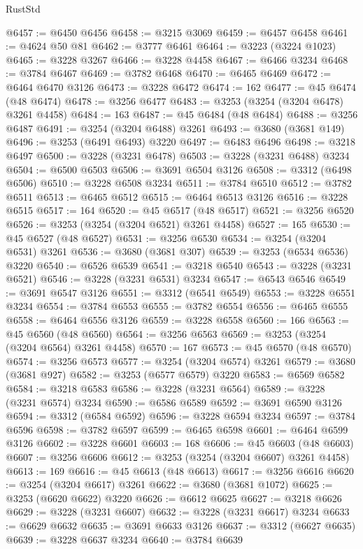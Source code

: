 \begin{lexlean}{RustStd}
\begin{coremodule}
@6457 := @6450 @6456
@6458 := @3215 @3069
@6459 := @6457 @6458
@6461 := @4624 @50 @81
@6462 := @3777 @6461
@6464 := @3223 (@3224 @1023)
@6465 := @3228 @3267
@6466 := @3228 @4458
@6467 := @6466 @3234
@6468 := @3784 @6467
@6469 := @3782 @6468
@6470 := @6465 @6469
@6472 := @6464 @6470 @3126
@6473 := @3228 @6472
@6474 := 162
@6477 := @45 @6474 (@48 @6474)
@6478 := @3256 @6477
@6483 := @3253 (@3254 (@3204 @6478) @3261 @4458)
@6484 := 163
@6487 := @45 @6484 (@48 @6484)
@6488 := @3256 @6487
@6491 := @3254 (@3204 @6488) @3261
@6493 := @3680 (@3681 @149)
@6496 := @3253 (@6491 @6493) @3220
@6497 := @6483 @6496
@6498 := @3218 @6497
@6500 := @3228 (@3231 @6478)
@6503 := @3228 (@3231 @6488) @3234
@6504 := @6500 @6503
@6506 := @3691 @6504 @3126
@6508 := @3312 (@6498 @6506)
@6510 := @3228 @6508 @3234
@6511 := @3784 @6510
@6512 := @3782 @6511
@6513 := @6465 @6512
@6515 := @6464 @6513 @3126
@6516 := @3228 @6515
@6517 := 164
@6520 := @45 @6517 (@48 @6517)
@6521 := @3256 @6520
@6526 := @3253 (@3254 (@3204 @6521) @3261 @4458)
@6527 := 165
@6530 := @45 @6527 (@48 @6527)
@6531 := @3256 @6530
@6534 := @3254 (@3204 @6531) @3261
@6536 := @3680 (@3681 @307)
@6539 := @3253 (@6534 @6536) @3220
@6540 := @6526 @6539
@6541 := @3218 @6540
@6543 := @3228 (@3231 @6521)
@6546 := @3228 (@3231 @6531) @3234
@6547 := @6543 @6546
@6549 := @3691 @6547 @3126
@6551 := @3312 (@6541 @6549)
@6553 := @3228 @6551 @3234
@6554 := @3784 @6553
@6555 := @3782 @6554
@6556 := @6465 @6555
@6558 := @6464 @6556 @3126
@6559 := @3228 @6558
@6560 := 166
@6563 := @45 @6560 (@48 @6560)
@6564 := @3256 @6563
@6569 := @3253 (@3254 (@3204 @6564) @3261 @4458)
@6570 := 167
@6573 := @45 @6570 (@48 @6570)
@6574 := @3256 @6573
@6577 := @3254 (@3204 @6574) @3261
@6579 := @3680 (@3681 @927)
@6582 := @3253 (@6577 @6579) @3220
@6583 := @6569 @6582
@6584 := @3218 @6583
@6586 := @3228 (@3231 @6564)
@6589 := @3228 (@3231 @6574) @3234
@6590 := @6586 @6589
@6592 := @3691 @6590 @3126
@6594 := @3312 (@6584 @6592)
@6596 := @3228 @6594 @3234
@6597 := @3784 @6596
@6598 := @3782 @6597
@6599 := @6465 @6598
@6601 := @6464 @6599 @3126
@6602 := @3228 @6601
@6603 := 168
@6606 := @45 @6603 (@48 @6603)
@6607 := @3256 @6606
@6612 := @3253 (@3254 (@3204 @6607) @3261 @4458)
@6613 := 169
@6616 := @45 @6613 (@48 @6613)
@6617 := @3256 @6616
@6620 := @3254 (@3204 @6617) @3261
@6622 := @3680 (@3681 @1072)
@6625 := @3253 (@6620 @6622) @3220
@6626 := @6612 @6625
@6627 := @3218 @6626
@6629 := @3228 (@3231 @6607)
@6632 := @3228 (@3231 @6617) @3234
@6633 := @6629 @6632
@6635 := @3691 @6633 @3126
@6637 := @3312 (@6627 @6635)
@6639 := @3228 @6637 @3234
@6640 := @3784 @6639

\end{coremodule}
\end{lexlean}
